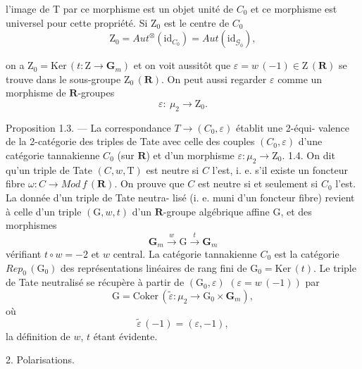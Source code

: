 \documentclass[11pt]{article}
\newcommand{\scanpage}[1]{\par\bigskip\noindent{\small\sffamily[scan #1]}\par}
\newcommand{\mspage}[1]{{\small\sffamily[p.\,#1]}}
\newcommand{\hand}[1]{\textcolor{blue}{#1}}
\begin{document}
l'image de T par ce morphisme est un objet unité de $C_{0}$ et ce morphisme
est universel pour cette propriété. Si $\mathrm{Z}_{0}$ est le centre de $C_{0}$
\[ \mathrm{Z}_{0} = \mathit{Aut}^{\otimes}(\mathrm{id}_{C_{0}}) = \mathit{Aut}(\mathrm{id}_{\mathcal{G}_{0}}), \]

\mspage{\hand{65}}

\clearpage
\scanpage{119/66}
\mspage{( 2 )}

on a $\mathrm{Z}_0 = \mathrm{Ker}\,(t : \mathrm{Z} \to \mathbf{G}_m)$ et on voit aussitôt que $\varepsilon = w\,(-1) \in \mathrm{Z}\,(\mathbf{R})$
se trouve dans le sous-groupe $\mathrm{Z}_0\,(\mathbf{R})$. On peut aussi regarder $\varepsilon$ comme
un morphisme de $\mathbf{R}$-groupes
\[ \varepsilon : \ \mu_2 \to \mathrm{Z}_0. \]

Proposition 1.3. --- La correspondance $T \to (C_0, \varepsilon)$ établit une 2-équi-%
valence de la 2-catégorie des triples de Tate avec celle des couples $(C_0, \varepsilon)$
d'une catégorie tannakienne $C_0$ (sur $\mathbf{R}$) et d'un morphisme $\varepsilon : \mu_2 \to \mathrm{Z}_0$.
1.4. On dit qu'un triple de Tate $(C, w, \mathrm{T})$ est neutre si $C$ l'est, i. e.
s'il existe un foncteur fibre $\omega : C \to \mathit{Mod\,f}\,(\mathbf{R})$. On prouve que $C$ est
neutre si et seulement si $C_0$ l'est. La donnée d'un triple de Tate neutra-%
lisé (i. e. muni d'un foncteur fibre) revient à celle d'un triple $(\mathrm{G}, w, t)$
d'un $\mathbf{R}$-groupe algébrique affine G, et des morphismes
\[ \mathbf{G}_m \xrightarrow{w} \mathrm{G} \xrightarrow{t} \mathbf{G}_m \]
vérifiant $t \circ w = -2$ et $w$ central. La catégorie tannakienne $C_0$ est la
catégorie $\mathit{Rep}_0\,(\mathrm{G}_0)$ des représentations linéaires de rang fini de $\mathrm{G}_0 = \mathrm{Ker}\,(t)$.
Le triple de Tate neutralisé se récupère à partir de $(\mathrm{G}_0, \varepsilon)$ $(\varepsilon = w\,(-1))$
par
\[ \mathrm{G} = \mathrm{Coker}\,(\tilde{\varepsilon} : \mu_2 \to \mathrm{G}_0 \times \mathbf{G}_m), \]
où
\[ \tilde{\varepsilon}\,(-1) = (\varepsilon, -1), \]
la définition de $w$, $t$ étant évidente.

2. Polarisations.
\end{document}

